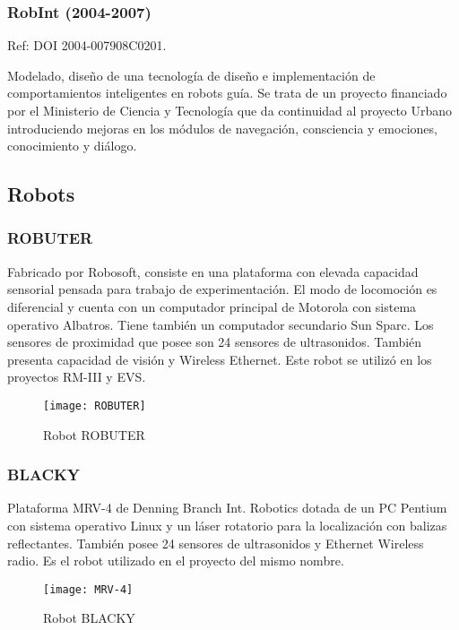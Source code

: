\clearpage
\subsubsection{RobInt (2004-2007)}
Ref: DOI 2004-007908C0201.

Modelado, diseño de una tecnología de diseño e implementación de comportamientos inteligentes en robots guía. Se trata de un proyecto financiado por el Ministerio de Ciencia y Tecnología que da continuidad al proyecto Urbano introduciendo mejoras en los módulos de navegación, consciencia y emociones, conocimiento y diálogo.

\subsection{Robots}
\subsubsection{ROBUTER}
Fabricado por Robosoft, consiste en una plataforma con elevada capacidad sensorial pensada para trabajo de experimentación. El modo de locomoción es diferencial y cuenta con un computador principal de Motorola con sistema operativo Albatros. Tiene también un computador secundario Sun Sparc. Los sensores de proximidad que posee son 24 sensores de ultrasonidos. También presenta capacidad de visión y Wireless Ethernet. Este robot se utilizó en los proyectos RM-III y EVS.

\begin{figure}[h]
  \centering\texttt{[image: ROBUTER]}\\
  \caption{Robot ROBUTER}\label{fg:robuter}
\end{figure}

\subsubsection{BLACKY}
Plataforma MRV-4 de Denning Branch Int. Robotics dotada de un PC Pentium con sistema operativo Linux y un láser rotatorio para la localización con balizas reflectantes. También posee 24 sensores de ultrasonidos y Ethernet Wireless radio. Es el robot utilizado en el proyecto del mismo nombre.

\begin{figure}[h]
  \centering\texttt{[image: MRV-4]}\\
  \caption{Robot BLACKY}\label{fg:mrv4}
\end{figure}

